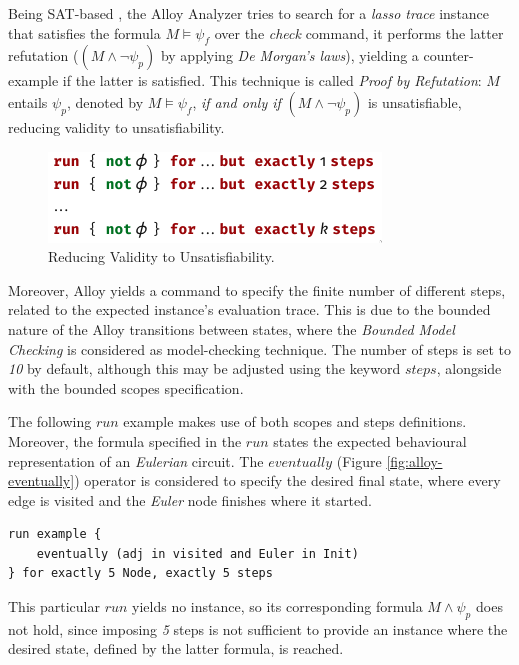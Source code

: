 Being SAT-based \cite{lwspecification}, the Alloy Analyzer tries to search for a \textit{lasso trace} instance that satisfies the formula $M \models \psi_{f}$ over the \textit{check} command, it performs the latter refutation ($(M \wedge \neg \psi_{p})$ by applying \textit{De Morgan's laws}), yielding a counter-example if the latter is satisfied. This technique is called \textit{Proof by Refutation}: $M$ entails $\psi_{p}$, denoted by $M \models \psi_{f}$, \textit{if and only if} $(M \wedge \neg \psi_{p})$ is unsatisfiable, reducing validity to unsatisfiability.

\begin{figure}[H]
    \centering
    \includegraphics[width=0.5\linewidth]{img/check_alloy_2.png}
    \caption{Reducing Validity to Unsatisfiability.}
    \label{fig:alloy-check-2}
\end{figure}

Moreover, Alloy yields a command to specify the finite number of different steps, related to the expected instance's evaluation trace. This is due to the bounded nature of the Alloy transitions between states, where the \textit{Bounded Model Checking} is considered as model-checking technique. The number of steps is set to \textit{10} by default, although this may be adjusted using the keyword $steps$, alongside with the bounded scopes specification. 

The following $run$ example makes use of both scopes and steps definitions. Moreover, the formula specified in the $run$ states the expected behavioural representation of an \textit{Eulerian} circuit. The $eventually$ (Figure \ref{fig:alloy-eventually}) operator is considered to specify the desired final state, where every edge is visited and the \textit{Euler} node finishes where it started.

\begin{lstlisting}[title={Bounded Model Checking: Eventually the graph will represent an \textit{Eulerian} circuit.}, otherkeywords = {run, eventually, in, and, for, exactly, \5, steps}, floatplacement=H]
run example {
    eventually (adj in visited and Euler in Init)
} for exactly 5 Node, exactly 5 steps
\end{lstlisting}

This particular $run$ yields no instance, so its corresponding formula $M \wedge \psi_{p}$ does not hold, since imposing \textit{5} steps is not sufficient to provide an instance where the desired state, defined by the latter formula, is reached.


